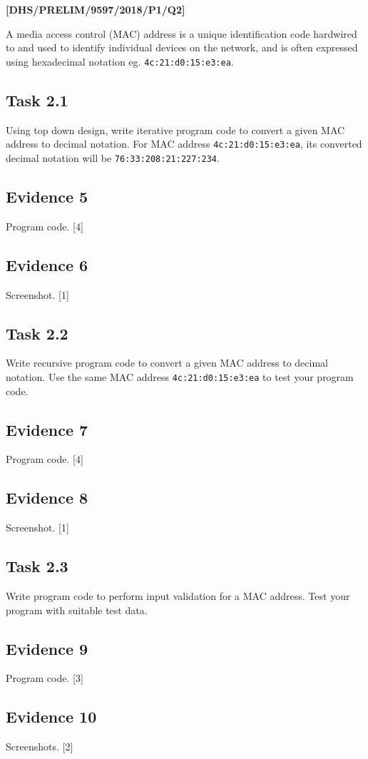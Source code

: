 \item \textbf{{[}DHS/PRELIM/9597/2018/P1/Q2{]} }

A media access control (MAC) address is a unique identification code
hardwired to and used to identify individual devices on the network,
and is often expressed using hexadecimal notation eg. \texttt{4c:21:d0:15:e3:ea}.

\subsection*{Task 2.1 }

Using top down design, write iterative program code to convert a given
MAC address to decimal notation. For MAC address \texttt{4c:21:d0:15:e3:ea},
its converted decimal notation will be \texttt{76:33:208:21:227:234}.

\subsection*{Evidence 5 }

Program code. \hfill{}{[}4{]}

\subsection*{Evidence 6}

Screenshot.\hfill{} {[}1{]}

\subsection*{Task 2.2}

Write recursive program code to convert a given MAC address to decimal
notation. Use the same MAC address \texttt{4c:21:d0:15:e3:ea} to test
your program code.

\subsection*{Evidence 7 }

Program code.\hfill{} {[}4{]}

\subsection*{Evidence 8 }

Screenshot. \hfill{}{[}1{]}

\subsection*{Task 2.3 }

Write program code to perform input validation for a MAC address.
Test your program with suitable test data.

\subsection*{Evidence 9 }

Program code. \hfill{}{[}3{]}

\subsection*{Evidence 10 }

Screenshots. \hfill{}{[}2{]}